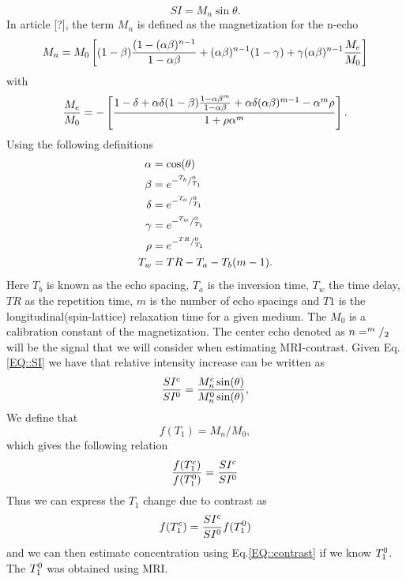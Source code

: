 \documentclass[11pt,a4paper]{article}
\begin{document}
\begin{equation}
SI = M_{n} \sin \theta.
\label{EQ::SI}
\end{equation}
In article [?], the term $M_n$ is defined as the magnetization for the n-echo 
\begin{equation}
M_{n} = M_{0}  \left[ (1-\beta)\frac{(1-(\alpha \beta)\sp{n-1} }{1-\alpha\beta} + (\alpha \beta)\sp{n-1}(1-\gamma) + \gamma ( \alpha \beta)\sp{n-1} \frac{M_{e}}{M_{0}}  \right]   
\end{equation}
with 
\begin{equation}
\frac{M_{e}}{M_{0}} = - \left[ \frac{ 1 -\delta + \alpha \delta (1-\beta ) \frac{1-\alpha\beta\sp{m}}{1-\alpha \beta} + \alpha\delta(\alpha\beta)\sp{m-1} - \alpha\sp{m}\rho}{1 +\rho \alpha\sp{m} } \right].
\end{equation}
Using the following definitions
\begin{equation}
\begin{aligned}
\alpha &= \cos ( \theta ) \\
\beta  &= e\sp{- \sp{T_b}/_{T_1}\sp{0} } \\
\delta &= e\sp{- \sp{T_a}/_{T_1}\sp{0} } \\
\gamma &= e\sp{- \sp{T_w}/_{T_1}\sp{0} } \\
\rho   &= e\sp{- \sp{TR}/_{T_1}\sp{0} }  \\
T_w    &= TR - T_a -T_b(m-1)       .\\
\end{aligned}
\end{equation}
Here $T_b$ is known as the echo spacing, $T_a$ is the inversion time, $T_w$ the time delay, $TR$ as the repetition time, $m$ is the number of echo spacings and $T1$ is the longitudinal(spin-lattice) relaxation time for a given medium. The $M_0$ is a calibration constant of the magnetization. The center echo denoted as $n=\sp{m}/_2$ will be the signal that we will consider when estimating MRI-contrast. Given Eq.\ref{EQ::SI} we have that relative intensity increase can be written as 
\begin{equation}
\frac{SI\sp{c}}{SI\sp{0}} = \frac{ M_{n}\sp{c} \sin (\theta)}{ M_{n}\sp{0} \sin (\theta) } ,
\end{equation}
We define that  
\begin{equation}
f(T_1) = M_{n}/M_{0} ,
\label{FIG::F}
\end{equation}
which gives the following relation 
\begin{equation}
\frac{f(T_{1}\sp{c} ) }{f(T_{1}\sp{0})}  = \frac{SI\sp{c}}{SI\sp{0}} 
\end{equation}
Thus we can express the $T_1$ change due to contrast as 
\begin{equation}
f ( T_{1}\sp{c} ) = \frac{SI\sp{c}}{SI\sp{0}} f(T_{1}\sp{0}) 
\end{equation}
and we can then estimate concentration using Eq.\ref{EQ::contrast} if we know $T_{1}\sp{0}$. The $T_{1}\sp{0}$ was obtained using MRI.
\end{document}
